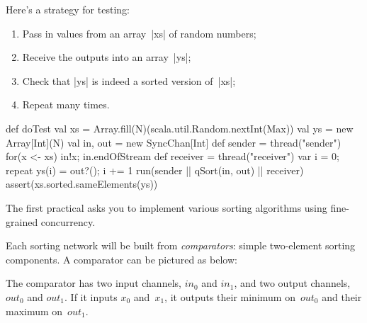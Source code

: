 \documentclass[notes,color]{sepslide0}
\begin{document}

\begin{slide}

Here's a strategy for testing:
%
\begin{enumerate}
\item Pass in values from an array~|xs| of random numbers;
\item Receive the outputs into an array~|ys|;
\item Check that |ys| is indeed a sorted version of~|xs|;
\item Repeat many times.
\end{enumerate}
%
\begin{scala}
  def doTest{
    val xs = Array.fill(N)(scala.util.Random.nextInt(Max))
    val ys = new Array[Int](N)
    val in, out = new SyncChan[Int]
    def sender = thread("sender"){ for(x <- xs) in!x; in.endOfStream }
    def receiver = thread("receiver"){ var i = 0; repeat{ ys(i) = out?(); i += 1 } }
    run(sender || qSort(in, out) || receiver)
    assert(xs.sorted.sameElements(ys))
  }
\end{scala}
\end{slide}


\begin{slide}

The first practical asks you to implement various sorting algorithms using
fine-grained concurrency.  

Each sorting network will be built from \emph{comparators}: simple
two-element sorting components.  A comparator can be pictured as below: 
%
\begin{center}
\end{center}
%
The comparator has two input channels, $in_0$ and $in_1$, and two output
channels, $out_0$ and $out_1$.  If it inputs $x_0$ and~$x_1$, it outputs their
minimum on~$out_0$ and their maximum on~$out_1$.
\end{slide}
\end{document}
